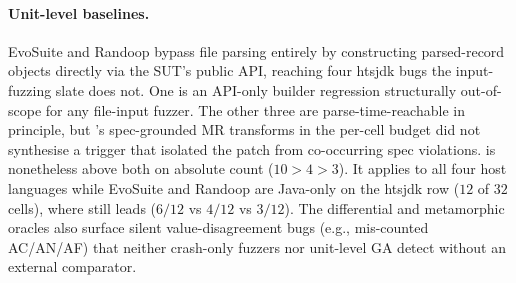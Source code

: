\paragraph{Unit-level baselines.}
EvoSuite and Randoop bypass file parsing entirely by
constructing parsed-record objects directly via the SUT's
public API, reaching four htsjdk bugs the input-fuzzing slate
does not. One is an API-only builder regression structurally
out-of-scope for any file-input fuzzer. The other three are
parse-time-reachable in principle, but \biotest{}'s
spec-grounded MR transforms in the per-cell budget did not
synthesise a trigger that isolated the patch from co-occurring
spec violations. \biotest{} is nonetheless above both on
absolute count ($10>4>3$). It applies to all four host
languages while EvoSuite and Randoop are Java-only on the
htsjdk row ($12$ of $32$ cells), where \biotest{} still leads
($6/12$ vs $4/12$ vs $3/12$). The differential and metamorphic
oracles also surface silent value-disagreement bugs (e.g.,
mis-counted AC/AN/AF) that neither crash-only fuzzers nor
unit-level GA detect without an external comparator.
